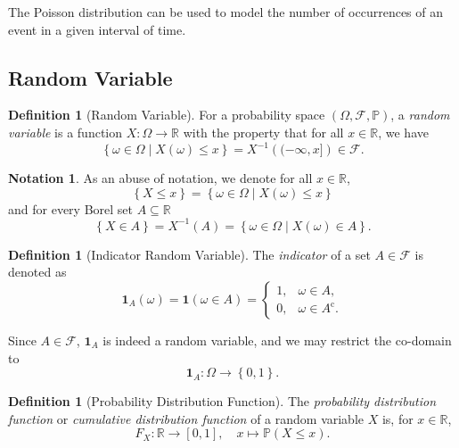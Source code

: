 \documentclass[11pt]{article}
\numberwithin{equation}{section}
\theoremstyle{definition}
\newtheorem{definition}[theorem]{Definition}
\newtheorem{notation}[theorem]{Notation}
\theoremstyle{remark}
\newcommand{\pqty}[1]{\left(#1\right)}
\newcommand{\Bqty}[1]{\left\{#1\right\}}
\newcommand{\set}[2]{\left\{#1\mid #2\right\}}
\newcommand{\ccintv}[2]{[#1,#2]}
\newcommand{\ocintv}[2]{(#1,#2]}
\newcommand{\functiondomain}[3]{#1:#2\to #3}
\newcommand{\function}[5]{#1:#2\to #3,\quad #4\mapsto #5}
\newcommand{\RR}{\mathbb R}
\newcommand{\inverse}{^{-1}}
\newcommand{\indicator}{\mathbf 1}
\newcommand{\compl}{^{\mathrm c}}
\newcommand{\eventSpace}{\mathcal F}
\newcommand{\Prob}{\mathbb P}
\begin{document}
The Poisson distribution can be used to model the number of occurrences of an event in a given interval of time.

\subsection{Random Variable}

\begin{definition}[Random Variable]\label{probability-definition-016}
    \label{probability-def:random-variable}%
    For a probability space \(\pqty{\Omega, \eventSpace, \Prob}\), a \emph{random variable} is a function \(\functiondomain{X}{\Omega}{\RR}\) with the property that for all \(x \in \RR\), we have
    \[
        \set{\omega \in \Omega}{X\pqty{\omega} \leq x} = X\inverse \pqty{\ocintv{-\infty}{x}} \in \eventSpace.
    \]
\end{definition}

\begin{notation}\label{probability-notation-001}
    As an abuse of notation, we denote for all \(x \in \RR\),
    \[
        \Bqty{X \leq x} = \set{\omega \in \Omega}{X\pqty{\omega} \leq x}
    \]
    and for every Borel set \(A \subseteq \RR\)
    \[
        \Bqty{X \in A} = X\inverse\pqty{A} = \set{\omega \in \Omega}{X\pqty{\omega} \in A}.
    \]
\end{notation}

\begin{definition}[Indicator Random Variable]\label{probability-definition-017}
    \label{probability-def:indicator-random-variable}%
    The \emph{indicator} of a set \(A \in \eventSpace\) is denoted as
    \[
        \indicator_{A} \pqty{\omega} = \indicator\pqty{\omega \in A} = \begin{cases}
            1, & \omega \in A, \\ 0, & \omega \in A\compl.
        \end{cases}
    \]

    Since \(A \in \eventSpace\), \(\indicator_{A}\) is indeed a random variable, and we may restrict the co-domain to
    \[
        \functiondomain{\indicator_{A}}{\Omega}{\Bqty{0, 1}}.
    \]
\end{definition}


\begin{definition}[Probability Distribution Function]\label{probability-definition-018}
    \label{probability-def:probability-distribution-function}%
    The \emph{probability distribution function} or \emph{cumulative distribution function} of a random variable \(X\) is, for \(x \in \RR\),
    \[
        \function{F_X}{\RR}{\ccintv{0}{1}}{x}{\Prob\pqty{X \leq x}.}
    \]
\end{definition}
\end{document}
